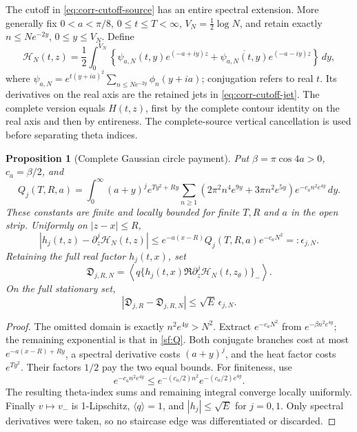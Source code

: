 \documentclass[11pt]{article}
\numberwithin{equation}{section}
\newtheorem{proposition}[theorem]{Proposition}
\theoremstyle{definition}
\theoremstyle{remark}
\newcommand{\dd}{\,d}
\begin{document}
The cutoff in \eqref{eq:corr-cutoff-source} has an entire spectral
extension.  More generally fix \(0<a<\pi/8\), \(0\le t\le T<\infty\),
\(V_N=\frac12\log N\), and retain exactly
\(n\le Ne^{-2y}\), \(0\le y\le V_N\).  Define
\begin{equation}
 \mathscr H_N(t,z)=\frac12\int_0^{V_N}
 \left\{\psi_{a,N}(t,y)e^{(-a+iy)z}
       +\overline{\psi_{a,N}(t,y)}e^{(-a-iy)z}\right\}\dd y ,
 \label{sf:entire-cutoff}
\end{equation}
where \(\psi_{a,N}=e^{t(y+ia)^2}\sum_{n\le Ne^{-2y}}\phi_n(y+ia)\);
conjugation refers to real \(t\).  Its derivatives on the real axis
are the retained jets in \eqref{eq:corr-cutoff-jet}.  The complete
version equals \(H(t,z)\), first by the complete contour identity on
the real axis and then by entireness.  The complete-source vertical
cancellation is used before separating theta indices.

\begin{proposition}[Complete Gaussian circle payment]
\label{sf:circle-tail}
Put \(\beta=\pi\cos4a>0\), \(c_a=\beta/2\), and
\begin{equation}
 Q_j(T,R,a)=\int_0^\infty(a+y)^je^{Ty^2+Ry}
 \sum_{n\ge1}(2\pi^2n^4e^{9y}+3\pi n^2e^{5y})
                     e^{-c_an^2e^{4y}}\dd y .
 \label{sf:Q}
\end{equation}
These constants are finite and locally bounded for finite \(T,R\)
and \(a\) in the open strip.  Uniformly on \(|z-x|\le R\),
\begin{equation}
 |h_j(t,z)-\partial_z^j\mathscr H_N(t,z)|
 \le e^{-a(x-R)}Q_j(T,R,a)e^{-c_aN^2}
 =:\epsilon_{j,N}.
 \label{sf:circle-tail-bound}
\end{equation}
Retaining the full real factor \(h_j(t,x)\), set
\[
 \mathfrak D_{j,R,N}
 =\left\langle q
 \{h_j(t,x)\Re\partial_z^j\mathscr H_N(t,z_\theta)\}_-\right\rangle .
\]
On the full stationary set,
\begin{equation}
 |\mathfrak D_{j,R}-\mathfrak D_{j,R,N}|
                       \le\sqrt E\,\epsilon_{j,N}.
 \label{sf:defect-stability}
\end{equation}
\end{proposition}
\begin{proof}
The omitted domain is exactly \(n^2e^{4y}>N^2\).
Extract \(e^{-c_aN^2}\) from \(e^{-\beta n^2e^{4y}}\);
the remaining exponential is that in \eqref{sf:Q}.  Both conjugate
branches cost at most \(e^{-a(x-R)+Ry}\), a spectral derivative
costs \((a+y)^j\), and the heat factor costs \(e^{Ty^2}\).
Their factors \(1/2\) pay the two equal bounds.  For finiteness, use
\[
 e^{-c_an^2e^{4y}}
 \le e^{-(c_a/2)n^2}e^{-(c_a/2)e^{4y}}.
\]
The resulting theta-index sums and remaining integral converge
locally uniformly.  Finally \(v\mapsto v_-\) is 1-Lipschitz,
\(\langle q\rangle=1\), and \(|h_j|\le\sqrt E\) for \(j=0,1\).
Only spectral derivatives were taken, so no staircase edge was
differentiated or discarded.
\end{proof}
\end{document}
